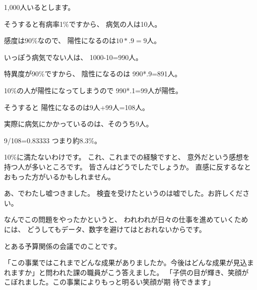 \documentclass[uplatex,jis2004,dvipdfmx,12pt]{jsarticle}
\begin{document}
1,000人いるとします。

そうすると有病率1\%ですから、
病気の人は10人。


感度は90\%なので、
陽性になるのは$10*.9=9$人。


いっぽう病気でない人は、
1000-10=990人。

特異度が90\%ですから、
陰性になるのは
990*.9=891人。

10\%の人が陽性になってしまうので
990*.1=99人が陽性。

そうすると
陽性になるのは9人+99人=108人。

実際に病気にかかっているのは、そのうち9人。

9/108=0.83333
つまり約8.3\%。

10\%に満たないわけです。
これ、これまでの経験ですと、
意外だという感想を持つ人が多いところです。
皆さんはどうでしたでしょうか。
直感に反するなとおもった方がいるかもしれません。


\bigskip



あ、でわたし嘘つきました。
検査を受けたというのは嘘でした。お許しください。

なんでこの問題をやったかというと、
われわれが日々の仕事を進めていくためには、
どうしてもデータ、数字を避けてはとおれないからです。


とある予算関係の会議でのことです。

「この事業ではこれまでどんな成果がありましたか。今後はどんな成果が見込ま
れますか」と問われた課の職員がこう答えました。
「子供の目が輝き、笑顔がこぼれました。この事業によりもっと明るい笑顔が期
待できます」
\end{document}
